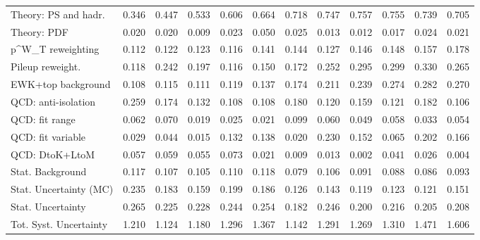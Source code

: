 \begin{tabular}{l|p{0.6cm}p{0.6cm}p{0.6cm}p{0.6cm}p{0.6cm}p{0.6cm}p{0.6cm}p{0.6cm}p{0.6cm}p{0.6cm}p{0.6cm}}
Theory: PS and hadr.                     & 0.346 & 0.447 & 0.533 & 0.606 & 0.664 & 0.718 & 0.747 & 0.757 & 0.755 & 0.739 & 0.705 \\
Theory: PDF                              & 0.020 & 0.020 & 0.009 & 0.023 & 0.050 & 0.025 & 0.013 & 0.012 & 0.017 & 0.024 & 0.021 \\
p^{W}_{T} reweighting                    & 0.112 & 0.122 & 0.123 & 0.116 & 0.141 & 0.144 & 0.127 & 0.146 & 0.148 & 0.157 & 0.178 \\
Pileup reweight.                         & 0.118 & 0.242 & 0.197 & 0.116 & 0.150 & 0.172 & 0.252 & 0.295 & 0.299 & 0.330 & 0.265 \\
EWK+top background                       & 0.108 & 0.115 & 0.111 & 0.119 & 0.137 & 0.174 & 0.211 & 0.239 & 0.274 & 0.282 & 0.270 \\
QCD: anti-isolation                      & 0.259 & 0.174 & 0.132 & 0.108 & 0.108 & 0.180 & 0.120 & 0.159 & 0.121 & 0.182 & 0.106 \\
QCD: fit range                           & 0.062 & 0.070 & 0.019 & 0.025 & 0.021 & 0.099 & 0.060 & 0.049 & 0.058 & 0.033 & 0.054 \\
QCD: fit variable                        & 0.029 & 0.044 & 0.015 & 0.132 & 0.138 & 0.020 & 0.230 & 0.152 & 0.065 & 0.202 & 0.166 \\
QCD: DtoK+LtoM                           & 0.057 & 0.059 & 0.055 & 0.073 & 0.021 & 0.009 & 0.013 & 0.002 & 0.041 & 0.026 & 0.004 \\
Stat. Background                         & 0.117 & 0.107 & 0.105 & 0.110 & 0.118 & 0.079 & 0.106 & 0.091 & 0.088 & 0.086 & 0.093 \\
Stat. Uncertainty (MC)                   & 0.235 & 0.183 & 0.159 & 0.199 & 0.186 & 0.126 & 0.143 & 0.119 & 0.123 & 0.121 & 0.151 \\
\hline
Stat. Uncertainty                        & 0.265 & 0.225 & 0.228 & 0.244 & 0.254 & 0.182 & 0.246 & 0.200 & 0.216 & 0.205 & 0.208 \\
\hline
Tot. Syst. Uncertainty                   & 1.210 & 1.124 & 1.180 & 1.296 & 1.367 & 1.142 & 1.291 & 1.269 & 1.310 & 1.471 & 1.606 \\
\hline
\end{tabular}
